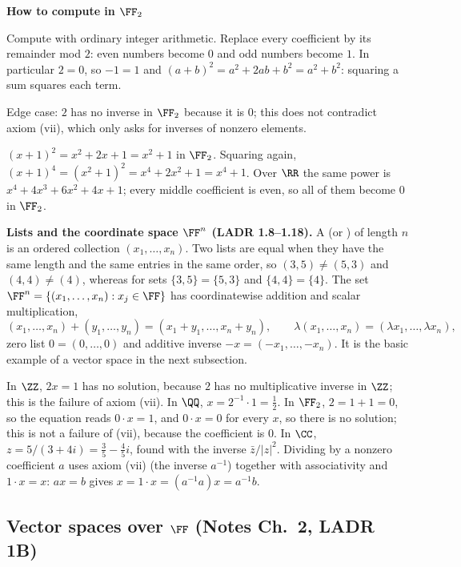 \documentclass[10pt]{scrartcl}
\newenvironment{methodbox}[1]{\begin{mdframed}[style=methodstyle]\textbf{\color{NavyBlue}#1}\par\vspace{2pt}}{\end{mdframed}}
\begin{document}
\begin{methodbox}{How to compute in $\FF_2$}
  \begin{steps}
    \ii Compute with ordinary integer arithmetic.
    \ii Replace every coefficient by its remainder mod $2$: even numbers become $0$ and odd numbers become $1$.
    \ii In particular $2=0$, so $-1=1$ and $(a+b)^2=a^2+2ab+b^2=a^2+b^2$: squaring a sum squares each term.
  \end{steps}
  Edge case: $2$ has no inverse in $\FF_2$ because it is $0$; this does not contradict axiom (vii), which only asks for inverses of nonzero elements.
\end{methodbox}

\begin{example*}[Repeated squaring in $\FF_2$: $(x+1)^4=x^4+1$]
  $(x+1)^2=x^2+2x+1=x^2+1$ in $\FF_2$. Squaring again, $(x+1)^4=(x^2+1)^2=x^4+2x^2+1=x^4+1$. Over $\RR$ the same power is $x^4+4x^3+6x^2+4x+1$; every middle coefficient is even, so all of them become $0$ in $\FF_2$.
\end{example*}

\textbf{Lists and the coordinate space $\FF^n$ (LADR 1.8--1.18).} A  (or ) of length $n$ is an ordered collection $(x_1,\dots,x_n)$. Two lists are equal when they have the same length and the same entries in the same order, so $(3,5)\ne(5,3)$ and $(4,4)\ne(4)$, whereas for sets $\{3,5\}=\{5,3\}$ and $\{4,4\}=\{4\}$. The set $\FF^n=\{(x_1,\dots,x_n):x_j\in\FF\}$ has coordinatewise addition and scalar multiplication,
\[
  (x_1,\dots,x_n)+(y_1,\dots,y_n)=(x_1+y_1,\dots,x_n+y_n),\qquad \lambda(x_1,\dots,x_n)=(\lambda x_1,\dots,\lambda x_n),
\]
zero list $0=(0,\dots,0)$ and additive inverse $-x=(-x_1,\dots,-x_n)$. It is the basic example of a vector space in the next subsection.

\revisit In $\ZZ$, $2x=1$ has no solution, because $2$ has no multiplicative inverse in $\ZZ$; this is the failure of axiom (vii). In $\QQ$, $x=2^{-1}\cdot1=\tfrac12$. In $\FF_2$, $2=1+1=0$, so the equation reads $0\cdot x=1$, and $0\cdot x=0$ for every $x$, so there is no solution; this is not a failure of (vii), because the coefficient is $0$. In $\CC$, $z=5/(3+4i)=\tfrac35-\tfrac45i$, found with the inverse $\bar z/|z|^2$. Dividing by a nonzero coefficient $a$ uses axiom (vii) (the inverse $a^{-1}$) together with associativity and $1\cdot x=x$: $ax=b$ gives $x=1\cdot x=(a^{-1}a)x=a^{-1}b$.

\subsection{Vector spaces over $\FF$ (Notes Ch.~2, LADR 1B)}
\end{document}
